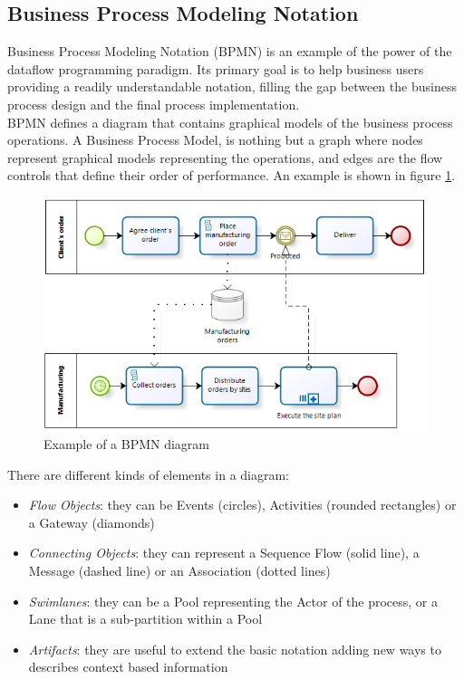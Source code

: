 \subsection{Business Process Modeling Notation}\label{BPMN}

Business Process Modeling Notation (BPMN) is an example of the power of the dataflow programming paradigm. Its primary goal is to help business users providing a readily understandable notation, filling the gap between the business process design and the final process implementation.
\\

BPMN defines a diagram that contains graphical models of the business process operations. A Business Process Model, is nothing but a graph where nodes represent graphical models representing the operations, and edges are the flow controls that define their order of performance. An example is shown in figure \ref{fig:bpmn}.
\\

 \begin{figure}[htbp]
   \centering
   \includegraphics[width=\linewidth]{pictures/bpmn.png}
   \caption{Example of a BPMN diagram}
   \label{fig:bpmn}
 \end{figure}

There are different kinds of elements in a diagram:

\begin{itemize}
\item{\textit{Flow Objects}: they can be Events (circles), Activities (rounded rectangles) or a Gateway (diamonds)}
\item{\textit{Connecting Objects}: they can represent a Sequence Flow (solid line), a Message (dashed line) or an Association (dotted lines)}
\item{\textit{Swimlanes}: they can be a Pool representing the Actor of the process, or a Lane that is a sub-partition within a Pool}
\item{\textit{Artifacts}: they are useful to extend the basic notation adding new ways to describes context based information}
\end{itemize}

